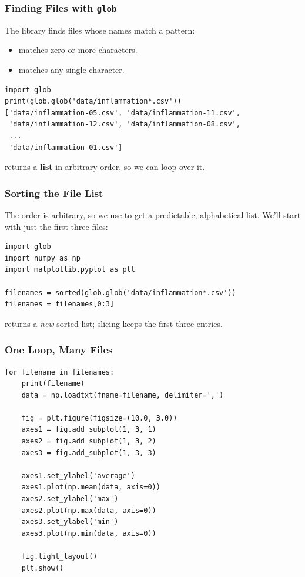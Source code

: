 \documentclass{beamer}
\begin{document}
\begin{frame}[fragile]
    \frametitle{Finding Files with \texttt{glob}}
    The  library finds files whose names match a pattern:
    \begin{itemize}
        \item \code{*} matches zero or more characters.
        \item {} matches any single character.
    \end{itemize}

    \begin{lstlisting}[style=demo]
import glob
print(glob.glob('data/inflammation*.csv'))
['data/inflammation-05.csv', 'data/inflammation-11.csv',
 'data/inflammation-12.csv', 'data/inflammation-08.csv',
 ...
 'data/inflammation-01.csv']
    \end{lstlisting}

     returns a \textbf{list} in arbitrary order, so we can
    loop over it.
\end{frame}

\begin{frame}[fragile]
    \frametitle{Sorting the File List}
    The order is arbitrary, so we use  to get a predictable,
    alphabetical list. We'll start with just the first three files:
    \begin{lstlisting}[style=demo]
import glob
import numpy as np
import matplotlib.pyplot as plt

filenames = sorted(glob.glob('data/inflammation*.csv'))
filenames = filenames[0:3]
    \end{lstlisting}

     returns a \emph{new} sorted list; slicing
    \code{[0:3]} keeps the first three entries.
\end{frame}

\begin{frame}[fragile]
    \frametitle{One Loop, Many Files}
    \begin{lstlisting}[style=demo]
for filename in filenames:
    print(filename)
    data = np.loadtxt(fname=filename, delimiter=',')

    fig = plt.figure(figsize=(10.0, 3.0))
    axes1 = fig.add_subplot(1, 3, 1)
    axes2 = fig.add_subplot(1, 3, 2)
    axes3 = fig.add_subplot(1, 3, 3)

    axes1.set_ylabel('average')
    axes1.plot(np.mean(data, axis=0))
    axes2.set_ylabel('max')
    axes2.plot(np.max(data, axis=0))
    axes3.set_ylabel('min')
    axes3.plot(np.min(data, axis=0))

    fig.tight_layout()
    plt.show()
    \end{lstlisting}
\end{frame}
\end{document}
